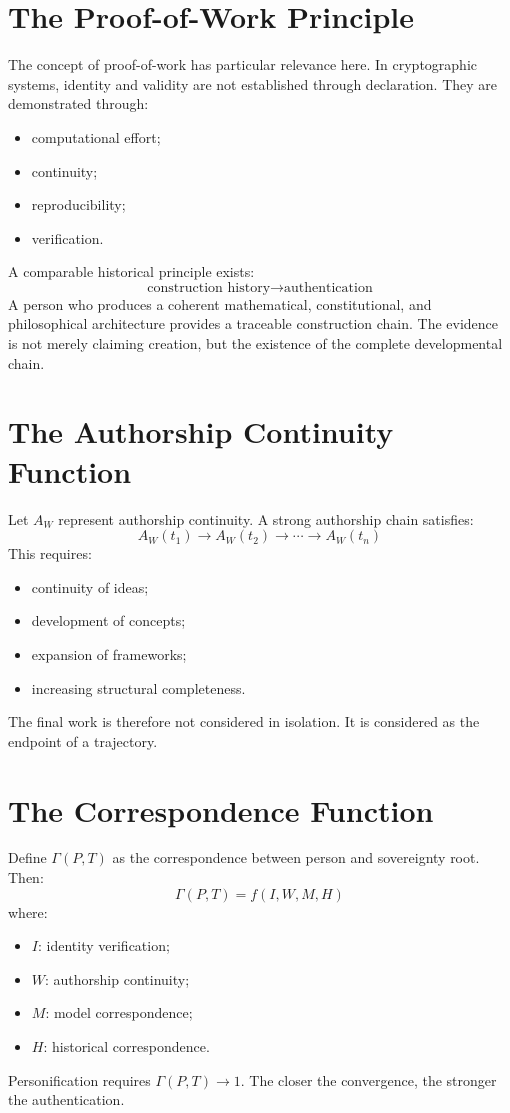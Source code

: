 \documentclass[11pt,openany]{book}
\theoremstyle{plain}
\theoremstyle{definition}
\begin{document}
\section{The Proof-of-Work Principle}

The concept of proof-of-work has particular relevance here. In cryptographic systems, identity and validity are not established through declaration. They are demonstrated through:
\begin{itemize}
\item computational effort;
\item continuity;
\item reproducibility;
\item verification.
\end{itemize}
A comparable historical principle exists:
\[
\text{construction history} \longrightarrow \text{authentication}
\]
A person who produces a coherent mathematical, constitutional, and philosophical architecture provides a traceable construction chain. The evidence is not merely claiming creation, but the existence of the complete developmental chain.

\section{The Authorship Continuity Function}

Let \(A_W\) represent authorship continuity. A strong authorship chain satisfies:
\[
A_W(t_1) \longrightarrow A_W(t_2) \longrightarrow \cdots \longrightarrow A_W(t_n)
\]
This requires:
\begin{itemize}
\item continuity of ideas;
\item development of concepts;
\item expansion of frameworks;
\item increasing structural completeness.
\end{itemize}
The final work is therefore not considered in isolation. It is considered as the endpoint of a trajectory.

\section{The Correspondence Function}

Define \(\Gamma(P, T)\) as the correspondence between person and sovereignty root. Then:
\[
\Gamma(P, T) = f(I, W, M, H)
\]
where:
\begin{itemize}
\item \(I\): identity verification;
\item \(W\): authorship continuity;
\item \(M\): model correspondence;
\item \(H\): historical correspondence.
\end{itemize}
Personification requires \(\Gamma(P, T) \to 1\). The closer the convergence, the stronger the authentication.
\end{document}
